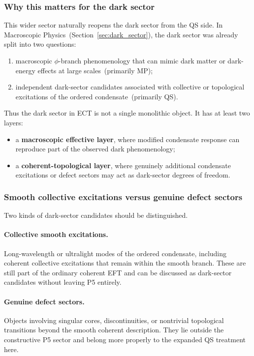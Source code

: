 \subsubsection*{Why this matters for the dark sector}

This wider sector naturally reopens the dark sector from the QS side.
In Macroscopic Physics~(Section~\ref{sec:dark_sector}), the dark sector
was already split into two questions:
\begin{enumerate}[label=(\roman*)]
  \item macroscopic $\phi$-branch phenomenology that can mimic dark
    matter or dark-energy effects at large scales~(primarily MP);
  \item independent dark-sector candidates associated with collective or
    topological excitations of the ordered condensate~(primarily QS).
\end{enumerate}
Thus the dark sector in ECT is not a single monolithic object.
It has at least two layers:
\begin{itemize}
  \item a \textbf{macroscopic effective layer}, where modified condensate
    response can reproduce part of the observed dark phenomenology;
  \item a \textbf{coherent-topological layer}, where genuinely additional
    condensate excitations or defect sectors may act as dark-sector
    degrees of freedom.
\end{itemize}

\subsubsection*{Smooth collective excitations versus genuine defect sectors}

Two kinds of dark-sector candidates should be distinguished.

\paragraph{Collective smooth excitations.}
Long-wavelength or ultralight modes of the ordered condensate, including
coherent collective excitations that remain within the smooth branch.
These are still part of the ordinary coherent EFT and can be discussed
as dark-sector candidates without leaving P5 entirely.

\paragraph{Genuine defect sectors.}
Objects involving singular cores, discontinuities, or nontrivial
topological transitions beyond the smooth coherent description.
They lie outside the constructive P5 sector and belong more properly
to the expanded QS treatment here.

